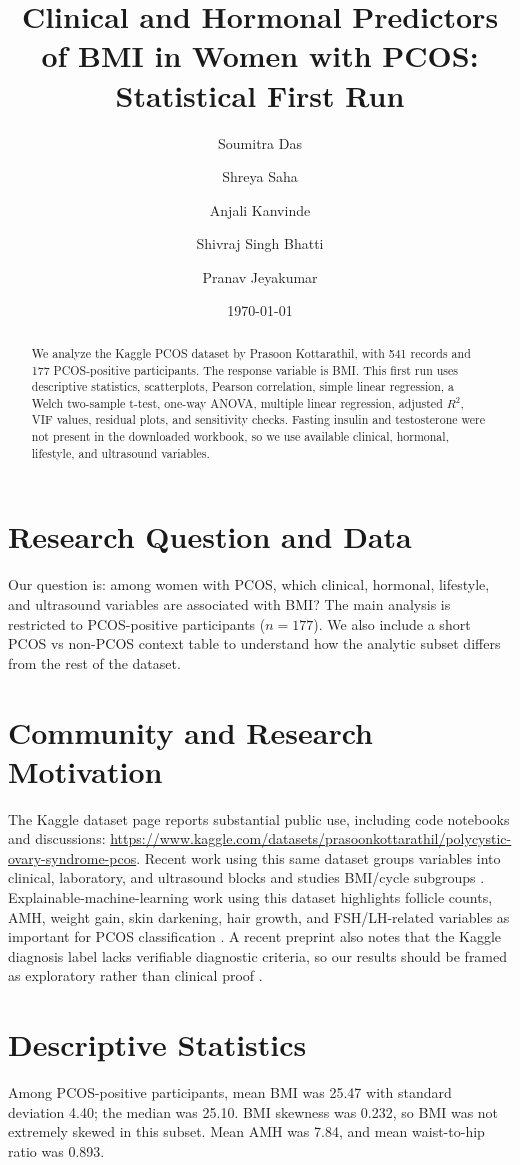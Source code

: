 \documentclass[10pt,twocolumn]{article}
\title{Clinical and Hormonal Predictors of BMI in Women with PCOS: Statistical First Run}
\author{Soumitra Das \and Shreya Saha \and Anjali Kanvinde \and Shivraj Singh Bhatti \and Pranav Jeyakumar}
\date{\today}
\begin{document}
\sloppy
\maketitle

\begin{abstract}
We analyze the Kaggle PCOS dataset by Prasoon Kottarathil, with 541 records and 177 PCOS-positive participants. The response variable is BMI. This first run uses descriptive statistics, scatterplots, Pearson correlation, simple linear regression, a Welch two-sample t-test, one-way ANOVA, multiple linear regression, adjusted $R^2$, VIF values, residual plots, and sensitivity checks. Fasting insulin and testosterone were not present in the downloaded workbook, so we use available clinical, hormonal, lifestyle, and ultrasound variables.
\end{abstract}

\section{Research Question and Data}
Our question is: among women with PCOS, which clinical, hormonal, lifestyle, and ultrasound variables are associated with BMI? The main analysis is restricted to PCOS-positive participants ($n=177$). We also include a short PCOS vs non-PCOS context table to understand how the analytic subset differs from the rest of the dataset.

\section{Community and Research Motivation}
The Kaggle dataset page reports substantial public use, including code notebooks and discussions: \url{https://www.kaggle.com/datasets/prasoonkottarathil/polycystic-ovary-syndrome-pcos}. Recent work using this same dataset groups variables into clinical, laboratory, and ultrasound blocks and studies BMI/cycle subgroups \cite{autopcos}. Explainable-machine-learning work using this dataset highlights follicle counts, AMH, weight gain, skin darkening, hair growth, and FSH/LH-related variables as important for PCOS classification \cite{mdpi}. A recent preprint also notes that the Kaggle diagnosis label lacks verifiable diagnostic criteria, so our results should be framed as exploratory rather than clinical proof \cite{medrxiv}.

\section{Descriptive Statistics}
Among PCOS-positive participants, mean BMI was 25.47 with standard deviation 4.40; the median was 25.10. BMI skewness was 0.232, so BMI was not extremely skewed in this subset. Mean AMH was 7.84, and mean waist-to-hip ratio was 0.893.
\end{document}
